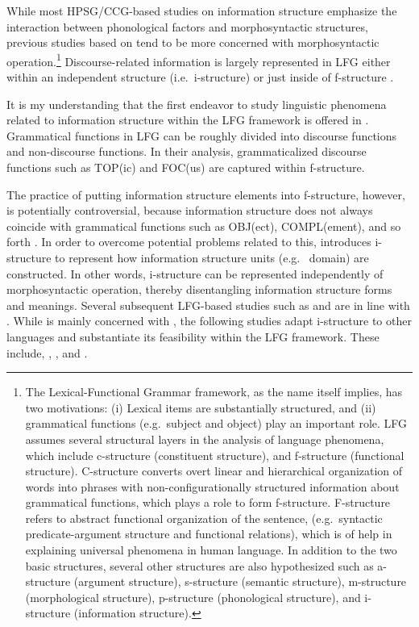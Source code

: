 While most HPSG/CCG-based studies on information structure emphasize
the interaction between phonological factors and morphosyntactic
structures, previous studies based on  tend
to be more concerned with morphosyntactic operation.\footnote{The
  Lexical-Functional Grammar framework, as the name itself implies,
  has two motivations: (i) Lexical items are substantially structured,
  and (ii) grammatical functions (e.g.\ subject and object) play an important role.
 LFG assumes several structural layers in the analysis
  of language phenomena, which include c-structure (constituent
  structure), and f-structure (functional structure). C-structure
  converts overt linear and hierarchical organization of words into
  phrases with non-configurationally structured information about
  grammatical functions, which plays a role to form
  f-structure. F-structure refers to abstract functional organization
  of the sentence, (e.g.\ syntactic predicate-argument structure and
  functional relations), which is of help in explaining universal
  phenomena in human language. In addition to the two basic
  structures, several other structures are also hypothesized such as
  a-structure (argument structure), s-structure (semantic structure),
  m-structure (morphological structure), p-structure (phonological
  structure), and i-structure (information structure).}
Discourse-related information is largely represented in LFG either
within an independent structure (i.e.\ i-structure) \citep{king:97} or
just inside of f-structure \citep{bresnan:01}.



It is my understanding that the first endeavor to study linguistic
phenomena related to information structure within the LFG framework is
offered in \citet{bresnan:mchombo:87}. Grammatical functions in LFG
can be roughly divided into discourse functions and non-discourse
functions.  In their analysis, grammaticalized discourse functions
such as TOP(ic) and FOC(us) are captured within f-structure.



The practice of putting information structure elements into
f-structure, however, is potentially controversial, because
information structure does not always coincide with grammatical
functions such as OBJ(ect), COMPL(ement), and so forth
\citep{king:zaenen:04}. In order to overcome potential problems
related to this, \citet{king:97} introduces i-structure to represent
how information structure units (e.g.\  domain) are
constructed. In other words, i-structure can be represented
independently of morphosyntactic operation, thereby disentangling
information structure forms and meanings.  Several subsequent
LFG-based studies such as \citet{choi:99} and \cite{man:07} are in
line with \citeauthor{king:97}. While \citeauthor{king:97} is mainly
concerned with , the following studies adapt i-structure
to other languages and substantiate its feasibility within the LFG
framework. These include,  \citep{choi:99}, 
\citep{choi:99}, and  \citep{man:07}.



